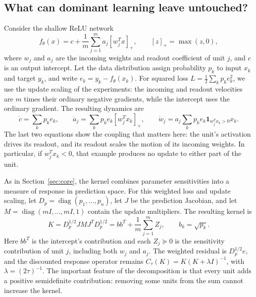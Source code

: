 \documentclass[11pt,a4paper]{article}
\begin{document}
\subsection{What can dominant learning leave untouched?}

Consider the shallow ReLU network
\begin{equation}
 f_\theta(x)=c+\frac1m\sum_{j=1}^m a_j[w_j^Tx]_+,
 \qquad [z]_+=\max(z,0),
 \label{eq:network}
\end{equation}
where $w_j$ and $a_j$ are the incoming weights and readout coefficient of unit $j$, and $c$ is an output intercept. Let the data distribution assign probability $p_k$ to input $x_k$ and target $y_k$, and write $e_k=y_k-f_\theta(x_k)$. For squared loss $L=\frac12\sum_k p_ke_k^2$, we use the update scaling of the experiments: the incoming and readout velocities are $m$ times their ordinary negative gradients, while the intercept uses the ordinary gradient. The resulting dynamics are
\begin{equation}
 \dot c=\sum_k p_ke_k,\qquad
 \dot a_j=\sum_k p_ke_k[w_j^Tx_k]_+,\qquad
 \dot w_j=a_j\sum_k p_ke_k\mathbf1_{w_j^Tx_k>0}x_k.
 \label{eq:weighted-dynamics}
\end{equation}
The last two equations show the coupling that matters here: the unit's activation drives its readout, and its readout scales the motion of its incoming weights. In particular, if $w_j^Tx_k<0$, that example produces no update to either part of the unit.

As in Section~\ref{sec:core}, the kernel combines parameter sensitivities into a measure of response in prediction space. For this weighted loss and update scaling, let $D_p=\operatorname{diag}(p_1,\ldots,p_n)$, let $J$ be the prediction Jacobian, and let $M=\operatorname{diag}(mI,\ldots,mI,1)$ contain the update multipliers. The resulting kernel is
\begin{equation}
 K=D_p^{1/2}J M J^T D_p^{1/2}
   =bb^T+\frac1m\sum_{j=1}^m Z_j,
 \qquad b_k=\sqrt{p_k}.
 \label{eq:weighted-kernel}
\end{equation}
Here $bb^T$ is the intercept's contribution and each $Z_j\succeq0$ is the sensitivity contribution of unit $j$, including both $w_j$ and $a_j$. The weighted residual is $D_p^{1/2}e$, and the discounted response operator remains $C_\tau(K)=K(K+\lambda I)^{-1}$, with $\lambda=(2\tau)^{-1}$. The important feature of the decomposition is that every unit adds a positive semidefinite contribution: removing some units from the sum cannot increase the kernel.
\end{document}

